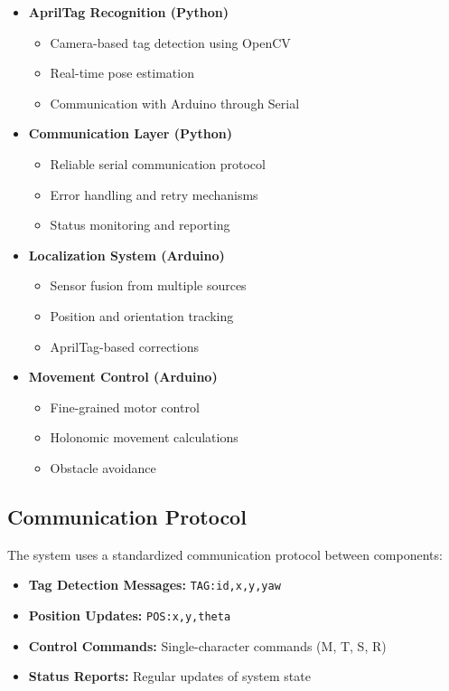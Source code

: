 \documentclass{article}
\begin{document}
\begin{itemize}
    \item \textbf{AprilTag Recognition (Python)}
        \begin{itemize}
            \item Camera-based tag detection using OpenCV
            \item Real-time pose estimation
            \item Communication with Arduino through Serial
        \end{itemize}
    
    \item \textbf{Communication Layer (Python)}
        \begin{itemize}
            \item Reliable serial communication protocol
            \item Error handling and retry mechanisms
            \item Status monitoring and reporting
        \end{itemize}
    
    \item \textbf{Localization System (Arduino)}
        \begin{itemize}
            \item Sensor fusion from multiple sources
            \item Position and orientation tracking
            \item AprilTag-based corrections
        \end{itemize}
    
    \item \textbf{Movement Control (Arduino)}
        \begin{itemize}
            \item Fine-grained motor control
            \item Holonomic movement calculations
            \item Obstacle avoidance
        \end{itemize}
\end{itemize}

\subsection{Communication Protocol}
The system uses a standardized communication protocol between components:

\begin{itemize}
    \item \textbf{Tag Detection Messages:} \texttt{TAG:id,x,y,yaw}
    \item \textbf{Position Updates:} \texttt{POS:x,y,theta}
    \item \textbf{Control Commands:} Single-character commands (M, T, S, R)
    \item \textbf{Status Reports:} Regular updates of system state
\end{itemize}
\end{document}
